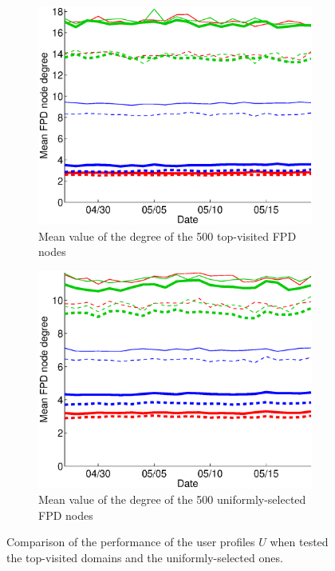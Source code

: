 \documentclass{sig-alternate}
\begin{document}
    \begin{figure}
   \centering

  \begin{subfigure}{.45\textwidth}
    \includegraphics[width=\textwidth]{figures/plots/top500-first-means.eps}
    \caption{Mean value of the degree of the 500 top-visited FPD nodes}
    \label{fig:top500_first_means}
  \end{subfigure}

  \begin{subfigure}{.45\textwidth}
    \includegraphics[width=\textwidth]{figures/plots/last500-first-means.eps}
    \caption{Mean value of the degree of the 500 uniformly-selected FPD nodes}
    \label{fig:top500_random_means}
  \end{subfigure}
  \caption{Comparison of the performance of the user profiles $U$ when tested the top-visited domains and the uniformly-selected ones.}
  \label{fig:top_last_domains_comparison}
  \end{figure}
\end{document}
